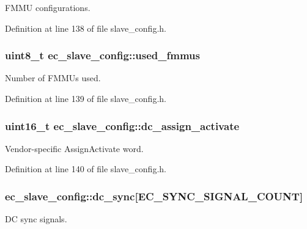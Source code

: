 \-F\-M\-M\-U configurations. 



\-Definition at line 138 of file slave\-\_\-config.\-h.

\subsubsection[{used\-\_\-fmmus}]{\setlength{\rightskip}{0pt plus 5cm}uint8\-\_\-t {\bf ec\-\_\-slave\-\_\-config\-::used\-\_\-fmmus}}\label{structec__slave__config_ab34b5531b56f3bb35ea0647f3aa8345a}


\-Number of \-F\-M\-M\-Us used. 



\-Definition at line 139 of file slave\-\_\-config.\-h.

\subsubsection[{dc\-\_\-assign\-\_\-activate}]{\setlength{\rightskip}{0pt plus 5cm}uint16\-\_\-t {\bf ec\-\_\-slave\-\_\-config\-::dc\-\_\-assign\-\_\-activate}}\label{structec__slave__config_a444000aa859f4830053b65518fc65233}


\-Vendor-\/specific \-Assign\-Activate word. 



\-Definition at line 140 of file slave\-\_\-config.\-h.

\subsubsection[{dc\-\_\-sync}]{ {\bf ec\-\_\-slave\-\_\-config\-::dc\-\_\-sync}[{\bf \-E\-C\-\_\-\-S\-Y\-N\-C\-\_\-\-S\-I\-G\-N\-A\-L\-\_\-\-C\-O\-U\-N\-T}]}\label{structec__slave__config_a947ad2e8f2573df6655965524575c5b8}


\-D\-C sync signals. 



